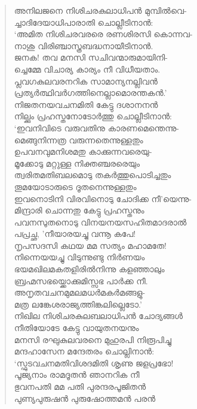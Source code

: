 \begin{verse}
അനിലജനെ നിശിചരകുലാധിപന്‍ മുമ്പില്‍വെ-\\
ച്ചാദിദേയാധിപാരാതി ചൊല്ലീടിനാന്‍:\\
‘അമിത നിശിചരവരരെ രണശിരസി കൊന്നവ-\\
നാശു വിരിഞ്ചാസ്ത്രബദ്ധനായീടിനാന്‍.\\
ജനക! തവ മനസി സചിവന്മാരുമായിനി-\\
ച്ചെമ്മേ വിചാര്യ കാര്യം നീ വിധീയതാം.\\
പ്ലവഗകുലവരനറിക സാമാന്യനല്ലിവന്‍\\
പ്രത്യര്‍ത്ഥിവര്‍ഗത്തിനെല്ലാമൊരന്തകന്‍.’\\
നിജതനയവചനമിതി കേട്ടു ദശാനനന്‍\\
നില്ക്കും പ്രഹസ്തനോടോര്‍ത്തു ചൊല്ലീടിനാന്‍:\\
‘ഇവനിവിടെ വരുവതിനു കാരണമെന്തെന്നു-\\
മെങ്ങുനിന്നത്ര വരുന്നതെന്നുള്ളതും\\
ഉപവനവുമനിശമതു കാക്കുന്നവരെയു-\\
മൂക്കോടു മറ്റുള്ള നിക്തഞ്ചരരെയും\\
ത്വരിതമതിബലമൊടു തകര്‍ത്തുപൊടിച്ചതും\\
തൂമയോടാരുടെ ദൂതനെന്നുള്ളതും\\
ഇവനൊടിനി വിരവിനൊടു ചോദിക്ക നീ’യെന്നു-\\
മിന്ദ്രാരി ചൊന്നതു കേട്ടു പ്രഹസ്തനും\\
പവനസുതനൊടു വിനയനയസഹിതമാദരാല്‍\\
പപ്രച്ഛ, ’നീയാരയച്ചു വന്നൂ കപേ!\\
നൃപസദസി കഥയ മമ സത്യം മഹാമതേ!\\
നിന്നെയയച്ചു വിടുന്നുണ്ടു നിര്‍ണയം\\
ഭയമഖിലമകതളിരില്‍നിന്നു കളഞ്ഞാലും\\
ബ്രഹ്മസഭയ്ക്കൊക്കുമിസ്സഭ പാര്‍ക്ക നീ.\\
അനൃതവചനമുമലമധര്‍മകര്‍മങ്ങളു-\\
മത്ര ലങ്കേശരാജ്യത്തിങ്കലില്ലെടോ.’\\
നിഖില നിശിചരകുലബലാധിപന്‍ ചോദ്യങ്ങള്‍\\
നീതിയോടേ കേട്ടു വായുതനയനും\\
മനസി രഘുകുലവരനെ മുഹുരപി നിരൂപിച്ചു\\
മന്ദഹാസേന മന്ദേതരം ചൊല്ലിനാന്‍:\\
‘സ്ഫുടവചനമതിവിശദമിതി ശൃണു ജളപ്രഭോ!\\
പൂജ്യനാം രാമദൂതന്‍ ഞാനറിക നീ\\
ഭുവനപതി മമ പതി പുരന്ദരപൂജിതന്‍\\
പുണ്യപുരുഷന്‍ പുരുഷോത്തമന്‍ പരന്‍\\

\end{verse}
